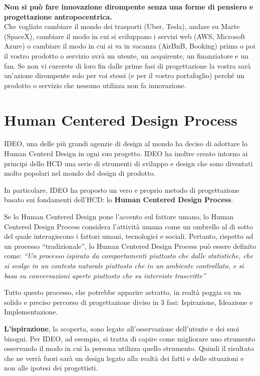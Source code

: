 \textbf{Non si può fare innovazione dirompente senza una forme di pensiero e progettazione antropocentrica.}\\
Che vogliate cambiare il mondo dei trasporti (Uber, Tesla), andare su Marte (SpaceX), cambiare il modo in cui si sviluppano i servizi web (AWS, Microsoft Azure) o cambiare il modo in cui si va in vacanza (AirBnB, Booking) prima o poi il vostro prodotto o servizio avrà un utente, un acquirente, un finanziatore e un fan. Se non vi curerete di loro fin dalle prime fasi di progettazione la vostra sarà un'azione dirompente solo per voi stessi (e per il vostro portafoglio) perché un prodotto o servizio che nessuno utilizza non fa innovazione.

\section{Human Centered Design Process}
IDEO, una delle più grandi agenzie di design al mondo ha deciso di adottare lo Human Centerd Design in ogni suo progetto. IDEO ha inoltre creato intorno ai principi dello HCD una serie di strumenti di sviluppo e design che sono diventati molto popolari nel mondo del design di prodotto.

In particolare, IDEO ha proposto un vero e proprio metodo di progettazione basato sui fondamenti dell'HCD: lo \textbf{Human Centered Design Process}.

Se lo Human Centered Design pone l'accento sul fattore umano, lo Human Centered Design Process considera l'attività umana come un ombrello al di sotto del quale interagiscono i fattori umani, tecnologici e sociali.
Pertanto, rispetto ad un processo ``tradizionale'', lo Human Centered Design Process può essere definito come: \textit{``Un processo ispirato da comportamenti piuttosto che dalle statistiche, che si svolge in un contesto naturale piuttosto che in un ambiente controllato, e si basa su conversazioni aperte piuttosto che su interviste trascritte''}

Tutto questo processo, che potrebbe apparire astratto, in realtà poggia su un solido e preciso percorso di progettazione diviso in 3 fasi: Ispirazione, Ideazione e Implementazione.

\textbf{L'ispirazione}, la scoperta, sono legate all'osservazione dell'utente e dei suoi bisogni. Per IDEO, ad esempio, si tratta di capire come migliorare uno strumento osservando il modo in cui la persona utilizza quello strumento.  Quindi il risultato che ne verrà fuori sarà un design legato alla realtà dei fatti e delle situazioni e non alle ipotesi dei progettisti.

